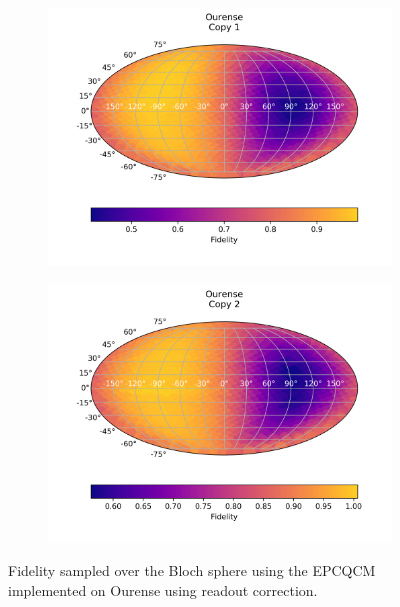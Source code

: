 \begin{figure}[H]
  \centering
  \begin{subfigure}{.5\textwidth}
    \centering
    \includegraphics[width=\textwidth]{Figures/Economical/IBM/FullSphere/results_corrected_ourense_copy1.png}
    
    \label{fig:epc_corrected_ourense_sphere_1}
  \end{subfigure}%
  \begin{subfigure}{.5\textwidth}
    \centering
    \includegraphics[width=\textwidth]{Figures/Economical/IBM/FullSphere/results_corrected_ourense_copy2.png}
    
    \label{fig:epc_corrected_ourense_sphere_2}
  \end{subfigure}
  \caption{Fidelity sampled over the Bloch sphere using the EPCQCM implemented on Ourense using readout correction.}
  \label{fig:epc_corrected_ourense_sphere}
\end{figure}

